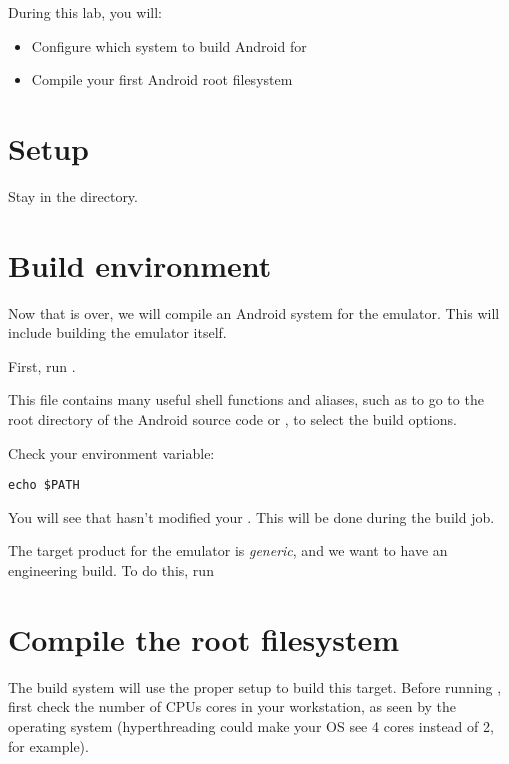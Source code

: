 
During this lab, you will:
\begin{itemize}
  \item Configure which system to build Android for
  \item Compile your first Android root filesystem
\end{itemize}

\section{Setup}

Stay in the  directory.

\section{Build environment}

Now that  is over, we will compile an Android system for the
emulator. This will include building the emulator itself.

First, run .

This file contains many useful shell functions and aliases, such as  to
go to the root directory of the Android source code or , to select
the build options.

Check your  environment variable:

\begin{verbatim}
echo $PATH
\end{verbatim}

You will see that  hasn't modified your .
This will be done during the build job.

The target product for the emulator is {\it generic}, and we want to have an 
engineering build. To do this, run 

\section{Compile the root filesystem}

The build system will use the proper setup to build this target. Before running
, first check the number of CPUs cores in your workstation, as seen by
the operating system (hyperthreading could make your OS see 4 cores instead of 2,
for example).

